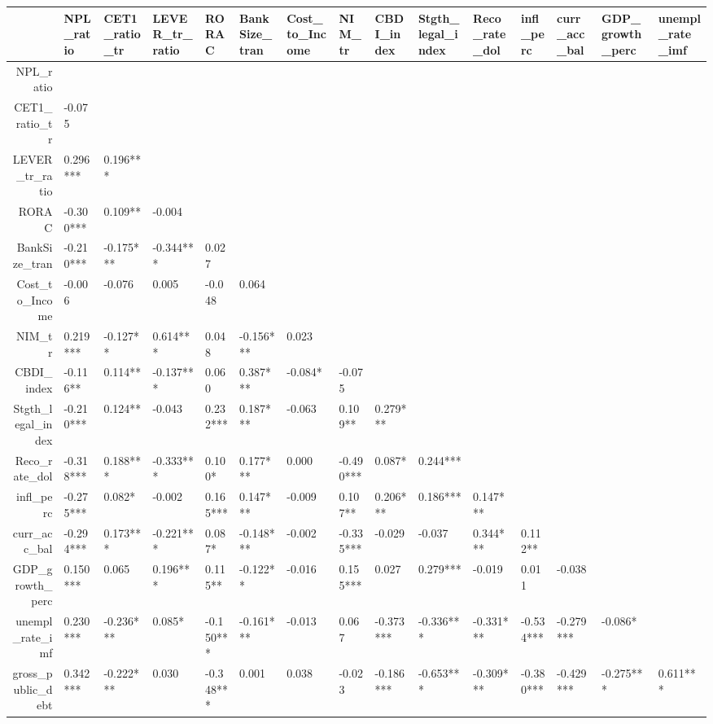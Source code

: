 \begin{table}[ht]
\centering
\begin{tabular}{rllllllllllllll}
  \hline
 & NPL\_ratio & CET1\_ratio\_tr & LEVER\_tr\_ratio & RORAC & BankSize\_tran & Cost\_to\_Income & NIM\_tr & CBDI\_index & Stgth\_legal\_index & Reco\_rate\_dol & infl\_perc & curr\_acc\_bal & GDP\_growth\_perc & unempl\_rate\_imf \\ 
  \hline
NPL\_ratio &  &  &  &  &  &  &  &  &  &  &  &  &  &  \\ 
  CET1\_ratio\_tr & -0.075     &  &  &  &  &  &  &  &  &  &  &  &  &  \\ 
  LEVER\_tr\_ratio &  0.296*** &  0.196*** &  &  &  &  &  &  &  &  &  &  &  &  \\ 
  RORAC & -0.300*** &  0.109**   & -0.004     &  &  &  &  &  &  &  &  &  &  &  \\ 
  BankSize\_tran & -0.210*** & -0.175*** & -0.344*** &  0.027     &  &  &  &  &  &  &  &  &  &  \\ 
  Cost\_to\_Income & -0.006     & -0.076     &  0.005     & -0.048     &  0.064     &  &  &  &  &  &  &  &  &  \\ 
  NIM\_tr &  0.219*** & -0.127**   &  0.614*** &  0.048     & -0.156***  &  0.023     &  &  &  &  &  &  &  &  \\ 
  CBDI\_index & -0.116**   &  0.114**   & -0.137***  &  0.060     &  0.387*** & -0.084*    & -0.075     &  &  &  &  &  &  &  \\ 
  Stgth\_legal\_index & -0.210*** &  0.124**   & -0.043     &  0.232*** &  0.187*** & -0.063     &  0.109**   &  0.279*** &  &  &  &  &  &  \\ 
  Reco\_rate\_dol & -0.318*** &  0.188*** & -0.333*** &  0.100*    &  0.177*** &  0.000     & -0.490*** &  0.087*    &  0.244*** &  &  &  &  &  \\ 
  infl\_perc & -0.275*** &  0.082*    & -0.002     &  0.165*** &  0.147***  & -0.009     &  0.107**   &  0.206*** &  0.186*** &  0.147***  &  &  &  &  \\ 
  curr\_acc\_bal & -0.294*** &  0.173*** & -0.221*** &  0.087*    & -0.148***  & -0.002     & -0.335*** & -0.029     & -0.037     &  0.344*** &  0.112**   &  &  &  \\ 
  GDP\_growth\_perc &  0.150***  &  0.065     &  0.196*** &  0.115**   & -0.122**   & -0.016     &  0.155***  &  0.027     &  0.279*** & -0.019     &  0.011     & -0.038     &  &  \\ 
  unempl\_rate\_imf &  0.230*** & -0.236*** &  0.085*    & -0.150***  & -0.161*** & -0.013     &  0.067     & -0.373*** & -0.336*** & -0.331*** & -0.534*** & -0.279*** & -0.086*    &  \\ 
  gross\_public\_debt &  0.342*** & -0.222*** &  0.030     & -0.348*** &  0.001     &  0.038     & -0.023     & -0.186*** & -0.653*** & -0.309*** & -0.380*** & -0.429*** & -0.275*** &  0.611*** \\ 
   \hline
\end{tabular}
\end{table}

